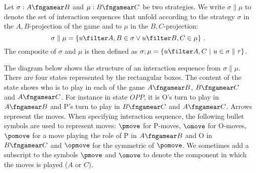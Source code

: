 Let $\sigma:A\fngamear B$ and $\mu:B\fngamear C$
be two strategies. We write $\sigma \parallel \mu$ to denote the 
set of interaction sequences that unfold according to the strategy $\sigma$ in the $A,B$-projection of the game and 
to $\mu$ in the $B,C$-projection:
$$ \sigma \parallel \mu = \{ u\filter A,B \in \sigma \vee u \filter B,C \in \mu \} \ .$$
The composite of $\sigma$ and $\mu$ is then defined as $\sigma ; \mu = \{ u \filter A,C \ | \ u \in \sigma \parallel \tau \}$.

The diagram below shows the structure of an interaction sequence
from $\sigma \parallel \mu$. There are four states represented by the rectangular boxes. The content of the state shows who is to play in each of the game $A\fngamear B$, $B\fngamear C$ and $A\fngamear C$.
For instance in state $OPP$, it is O's turn to play in 
$A\fngamear B$ and P's turn to play in $B\fngamear C$ and $A\fngamear C$. Arrows represent the moves.
When specifying interaction sequence,
the following bullet symbols are used to represent moves:
$\pmove$ for P-moves, $\omove$ for O-moves, $\pomove$ 
for a move playing the role of P in $A\fngamear B$
and O in $B\fngamear C$ and $\opmove$ for
the symmetric of $\pomove$.
We sometimes add a subscript to the symbols $\pmove$ and $\omove$ to denote the component in which the moves is played ($A$ or $C$).


